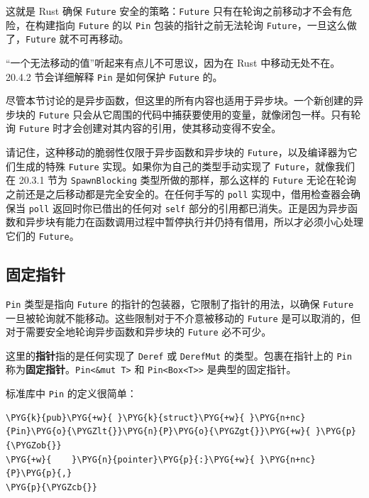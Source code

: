 这就是 Rust 确保 \texttt{Future} 安全的策略：\texttt{Future} 只有在轮询之前移动才不会有危险，在构建指向 \texttt{Future} 的以 \texttt{Pin} 包装的指针之前无法轮询 \texttt{Future}，一旦这么做了，\texttt{Future} 就不可再移动。

“一个无法移动的值”听起来有点儿不可思议，因为在 Rust 中移动无处不在。20.4.2 节会详细解释 \texttt{Pin} 是如何保护 \texttt{Future} 的。

尽管本节讨论的是异步函数，但这里的所有内容也适用于异步块。一个新创建的异步块的 \texttt{Future} 只会从它周围的代码中捕获要使用的变量，就像闭包一样。只有轮询 \texttt{Future} 时才会创建对其内容的引用，使其移动变得不安全。

请记住，这种移动的脆弱性仅限于异步函数和异步块的 \texttt{Future}，以及编译器为它们生成的特殊 \texttt{Future} 实现。如果你为自己的类型手动实现了 \texttt{Future}，就像我们在 20.3.1 节为 \texttt{SpawnBlocking} 类型所做的那样，那么这样的 \texttt{Future} 无论在轮询之前还是之后移动都是完全安全的。在任何手写的 \texttt{poll} 实现中，借用检查器会确保当 \texttt{poll} 返回时你已借出的任何对 \texttt{self} 部分的引用都已消失。正是因为异步函数和异步块有能力在函数调用过程中暂停执行并仍持有借用，所以才必须小心处理它们的 \texttt{Future}。

\subsection{固定指针}

\texttt{Pin} 类型是指向 \texttt{Future} 的指针的包装器，它限制了指针的用法，以确保 \texttt{Future} 一旦被轮询就不能移动。这些限制对于不介意被移动的 \texttt{Future} 是可以取消的，但对于需要安全地轮询异步函数和异步块的 \texttt{Future} 必不可少。

这里的\textbf{指针}指的是任何实现了 \texttt{Deref} 或 \texttt{DerefMut} 的类型。包裹在指针上的 \texttt{Pin} 称为\textbf{固定指针}。\texttt{Pin<\&mut T>} 和 \texttt{Pin<Box<T>>} 是典型的固定指针。

标准库中 \texttt{Pin} 的定义很简单：

\begin{Verbatim}[commandchars=\\\{\},breaklines=true,breakanywhere=true,fontsize=\codefont,xleftmargin=17bp]
\PYG{k}{pub}\PYG{+w}{ }\PYG{k}{struct}\PYG{+w}{ }\PYG{n+nc}{Pin}\PYG{o}{\PYGZlt{}}\PYG{n}{P}\PYG{o}{\PYGZgt{}}\PYG{+w}{ }\PYG{p}{\PYGZob{}}
\PYG{+w}{    }\PYG{n}{pointer}\PYG{p}{:}\PYG{+w}{ }\PYG{n+nc}{P}\PYG{p}{,}
\PYG{p}{\PYGZcb{}}
\end{Verbatim}


